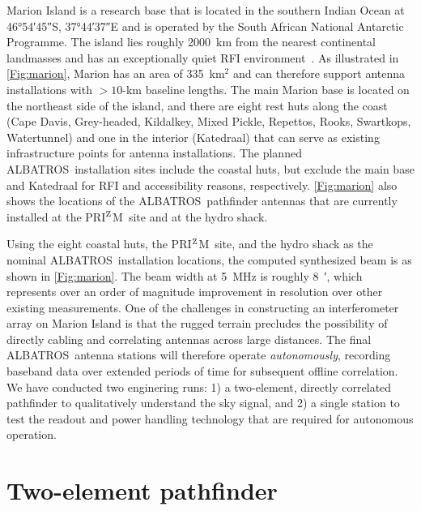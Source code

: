 \documentclass{ws-jai}
\def\albatros{ALBATROS}
\def\prizm{PRI$^{\rm Z}$M}
\begin{document}
Marion Island is a research base that is located in the southern
Indian Ocean at \ang{46;54;45}S, \ang{37;44;37}E and is operated by
the South African National Antarctic Programme.  The island lies
roughly \SI{2000}{\kilo\metre} from the nearest continental landmasses
and has an exceptionally quiet RFI
environment~\citep{2019JAI.....850004P}.  As illustrated in
\autoref{Fig:marion}, Marion has an area of 335~km$^2$ and can
therefore support antenna installations with $>10$-km baseline
lengths.  The main Marion base is located on the northeast side of the
island, and there are eight rest huts along the coast (Cape Davis,
Grey-headed, Kildalkey, Mixed Pickle, Repettos, Rooks, Swartkops,
Watertunnel) and one in the interior (Katedraal) that can serve as
existing infrastructure points for antenna installations.  The planned
\albatros\ installation sites include the coastal huts, but exclude
the main base and Katedraal for RFI and accessibility reasons,
respectively.  \autoref{Fig:marion} also shows the locations of the
\albatros\ pathfinder antennas that are currently installed at the
\prizm\ site and at the hydro shack.

Using the eight coastal huts, the \prizm\ site, and the hydro shack as
the nominal \albatros\ installation locations, the computed
synthesized beam is as shown in \autoref{Fig:marion}.  The beam width
at 5~MHz is roughly \SI{8}{\arcminute}, which represents over an order
of magnitude improvement in resolution over other existing
measurements.  One of the challenges in constructing an interferometer
array on Marion Island is that the rugged terrain precludes the
possibility of directly cabling and correlating antennas across large
distances.  The final \albatros\ antenna stations will therefore
operate {\it autonomously}, recording baseband data over extended
periods of time for subsequent offline correlation.  We have conducted
two enginering runs: 1) a two-element, directly correlated pathfinder
to qualitatively understand the sky signal, and 2) a single station to
test the readout and power handling technology that are required for
autonomous operation.

\section{Two-element pathfinder}
\end{document}
